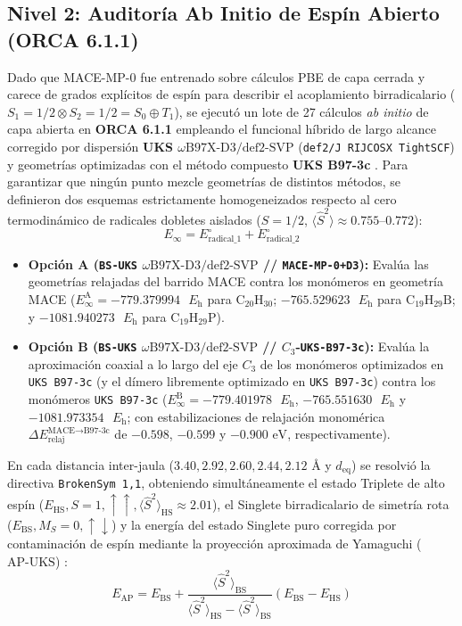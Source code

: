 \documentclass[10pt,twocolumn,a4paper]{article}
\begin{document}
\subsection{Nivel 2: Auditoría Ab Initio de Espín Abierto (ORCA 6.1.1)}
Dado que MACE-MP-0 fue entrenado sobre cálculos PBE de capa cerrada y carece de grados explícitos de espín para describir el acoplamiento birradicalario ($S_1 = 1/2 \otimes S_2 = 1/2 = S_0 \oplus T_1$), se ejecutó un lote de 27 cálculos \textit{ab initio} de capa abierta en \textbf{ORCA 6.1.1} \cite{Neese2022} empleando el funcional híbrido de largo alcance corregido por dispersión \textbf{UKS $\omega\text{B97X-D3/def2-SVP}$} (\texttt{def2/J RIJCOSX TightSCF}) \cite{Chai2013} y geometrías optimizadas con el método compuesto \textbf{UKS B97-3c} \cite{Brandenburg2018}. Para garantizar que ningún punto mezcle geometrías de distintos métodos, se definieron dos esquemas estrictamente homogeneizados respecto al cero termodinámico de radicales dobletes aislados ($S=1/2$, $\langle \hat{S}^2 \rangle \approx 0.755\text{--}0.772$):
\begin{equation}
    E_\infty = E_{\text{radical\_1}}^\circ + E_{\text{radical\_2}}^\circ
\end{equation}
\begin{itemize}
    \item \textbf{Opción A (\texttt{BS-UKS} $\omega\text{B97X-D3/def2-SVP}$ // \texttt{MACE-MP-0+D3}):} Evalúa las geometrías relajadas del barrido MACE contra los monómeros en geometría MACE ($E_\infty^{\text{A}} = -779.379994\text{ }E_{\text{h}}$ para $\text{C}_{20}\text{H}_{30}$; $-765.529623\text{ }E_{\text{h}}$ para $\text{C}_{19}\text{H}_{29}\text{B}$; y $-1081.940273\text{ }E_{\text{h}}$ para $\text{C}_{19}\text{H}_{29}\text{P}$).
    \item \textbf{Opción B (\texttt{BS-UKS} $\omega\text{B97X-D3/def2-SVP}$ // $C_3$-\texttt{UKS-B97-3c}):} Evalúa la aproximación coaxial a lo largo del eje $C_3$ de los monómeros optimizados en \texttt{UKS B97-3c} (y el dímero libremente optimizado en \texttt{UKS B97-3c}) contra los monómeros \texttt{UKS B97-3c} ($E_\infty^{\text{B}} = -779.401978\text{ }E_{\text{h}}$, $-765.551630\text{ }E_{\text{h}}$ y $-1081.973354\text{ }E_{\text{h}}$; con estabilizaciones de relajación monomérica $\Delta E_{\text{relaj}}^{\text{MACE}\to\text{B97-3c}}$ de $-0.598$, $-0.599$ y $-0.900\text{ eV}$, respectivamente).
\end{itemize}
En cada distancia inter-jaula ($3.40, 2.92, 2.60, 2.44, 2.12\text{ \AA}$ y $d_{\text{eq}}$) se resolvió la directiva \texttt{BrokenSym 1,1}, obteniendo simultáneamente el estado Triplete de alto espín ($E_{\text{HS}}, S=1, \uparrow\uparrow, \langle \hat{S}^2 \rangle_{\text{HS}} \approx 2.01$), el Singlete birradicalario de simetría rota ($E_{\text{BS}}, M_S=0, \uparrow\downarrow$) y la energía del estado Singlete puro corregida por contaminación de espín mediante la proyección aproximada de Yamaguchi ($\text{AP-UKS}$) \cite{Yamaguchi1988}:
\begin{equation}
    E_{\text{AP}} = E_{\text{BS}} + \frac{\langle \hat{S}^2 \rangle_{\text{BS}}}{\langle \hat{S}^2 \rangle_{\text{HS}} - \langle \hat{S}^2 \rangle_{\text{BS}}} \left(E_{\text{BS}} - E_{\text{HS}}\right)
\end{equation}
\end{document}

